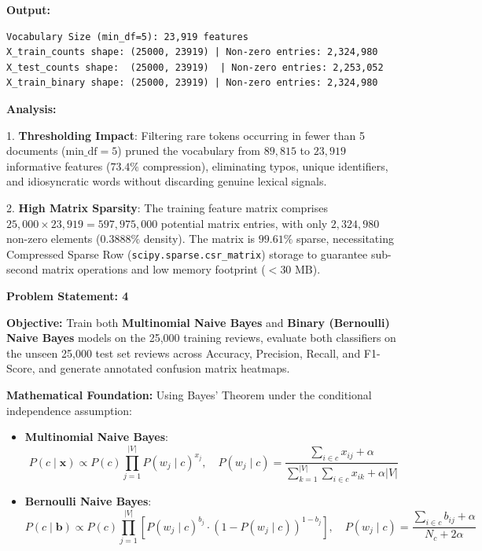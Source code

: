 \documentclass[12pt]{article}
\begin{document}
\textbf{Output:}

\begin{lstlisting}[style=output]
Vocabulary Size (min_df=5): 23,919 features
X_train_counts shape: (25000, 23919) | Non-zero entries: 2,324,980
X_test_counts shape:  (25000, 23919)  | Non-zero entries: 2,253,052
X_train_binary shape: (25000, 23919) | Non-zero entries: 2,324,980
\end{lstlisting}

\textbf{Analysis:}

1. \textbf{Thresholding Impact}: Filtering rare tokens occurring in fewer than 5 documents ($\text{min\_df}=5$) pruned the vocabulary from $89,815$ to $23,919$ informative features ($73.4\%$ compression), eliminating typos, unique identifiers, and idiosyncratic words without discarding genuine lexical signals.

2. \textbf{High Matrix Sparsity}: The training feature matrix comprises $25,000 \times 23,919 = 597,975,000$ potential matrix entries, with only $2,324,980$ non-zero elements ($0.3888\%$ density). The matrix is $99.61\%$ sparse, necessitating Compressed Sparse Row (\texttt{scipy.sparse.csr\_matrix}) storage to guarantee sub-second matrix operations and low memory footprint ($<30\text{ MB}$).

\vspace{0.4cm}


\textbf{Problem Statement: 4}

\textbf{Objective:} Train both \textbf{Multinomial Naive Bayes} and \textbf{Binary (Bernoulli) Naive Bayes} models on the 25,000 training reviews, evaluate both classifiers on the unseen 25,000 test set reviews across Accuracy, Precision, Recall, and F1-Score, and generate annotated confusion matrix heatmaps.

\vspace{0.2cm}
\textbf{Mathematical Foundation:}
Using Bayes' Theorem under the conditional independence assumption:
\begin{itemize}
    \item \textbf{Multinomial Naive Bayes}:
    \begin{equation}
        P(c \mid \mathbf{x}) \propto P(c) \prod_{j=1}^{|V|} P(w_j \mid c)^{x_j}, \quad P(w_j \mid c) = \frac{\sum_{i \in c} x_{ij} + \alpha}{\sum_{k=1}^{|V|} \sum_{i \in c} x_{ik} + \alpha |V|}
    \end{equation}
    \item \textbf{Bernoulli Naive Bayes}:
    \begin{equation}
        P(c \mid \mathbf{b}) \propto P(c) \prod_{j=1}^{|V|} \left[ P(w_j \mid c)^{b_j} \cdot (1 - P(w_j \mid c))^{1 - b_j} \right], \quad P(w_j \mid c) = \frac{\sum_{i \in c} b_{ij} + \alpha}{N_c + 2\alpha}
    \end{equation}
\end{itemize}
\end{document}
